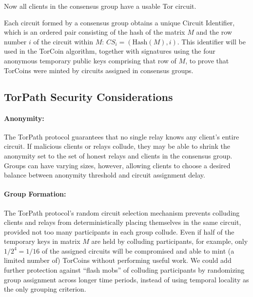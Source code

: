Now all clients in the consensus group have a usable Tor circuit.



Each circuit formed by a consensus group obtains a unique Circuit Identifier,
which is an ordered pair consisting of the hash of the matrix $M$ and the
row number $i$ of the circuit within $M$: $CS_i = (\mathrm{Hash}(M), i)$. This
identifier will be used in the TorCoin algorithm,
together with signatures using the four anonymous temporary public keys
comprising that row of $M$,
to prove that TorCoins were
minted by circuits assigned in consensus groups.

\subsection{TorPath Security Considerations} 

\paragraph{Anonymity:} The TorPath protocol guarantees that no single
relay knows any client's entire circuit. If malicious
clients or relays collude, they may be able to shrink the anonymity set to
the set of honest relays and clients in the consensus group. 
Groups can have varying sizes, however,
allowing clients to choose a desired balance
between anonymity threshold and circuit assignment delay.

\paragraph{Group Formation:}
The TorPath protocol's random circuit selection mechanism prevents
colluding clients and relays from deterministically placing themselves
in the same circuit,
provided not too many participants in each group collude.
Even if half of the temporary keys in matrix $M$
are held by colluding participants, for example,
only $1/2^4 = 1/16$ of the assigned circuits
will be compromised and able to mint (a limited number of)
TorCoins without performing useful work.
We could add further protection
against ``flash mobs'' of colluding participants
by randomizing group assignment across longer time periods,
instead of using temporal locality as the only grouping criterion.

